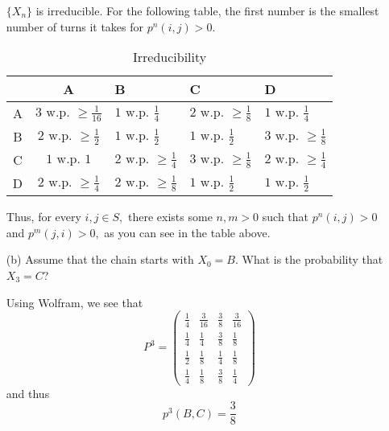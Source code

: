 \documentclass[11pt]{article}
\begin{document}
\begin{problem}
\begin{enumerate}
\begin{solution}
\begin{center}
\end{center}
$\{X_n\}$ is irreducible. For the following table, the first number is the smallest number of turns it takes for $p^n(i,j) >0.$ 
\begin{table}[H]
    \centering
    \begin{tabular}{|c|c|l|l|l|} \hline 
         &   A&B & C&D\\ \hline 
         A& 
     $3 \text{ w.p. } \geq\frac{1}{16}$ & $1 \text{ w.p. }\frac{1}{4}$& $2 \text{ w.p. }\geq\frac{1}{8}$ &$1 \text{ w.p. }\frac{1}{4}$\\ \hline 
 B&$2 \text{ w.p. }\geq\frac{1}{2}$ &$1 \text{ w.p. }\frac{1}{2}$ & $1 \text{ w.p. }\frac{1}{2}$&$3\text{ w.p. }\geq\frac{1}{8}$\\ \hline 
 C&$1 \text{ w.p. }{1}$ &$2 \text{ w.p. }\geq\frac{1}{4}$ &$3 \text{ w.p. }\geq\frac{1}{8}$ &$2 \text{ w.p. }\geq\frac{1}{4}$\\ \hline 
 D&$2 \text{ w.p. }\geq \frac{1}{4}$ &$2 \text{ w.p. }\geq\frac{1}{8}$ &$1 \text{ w.p. }\frac{1}{2}$ &$1 \text{ w.p. }\frac{1}{2}$\\ \hline\end{tabular}
    \caption{Irreducibility} 
\end{table}
Thus, for every $i,j \in S,$ there exists some $n,m>0$ such that $p^n(i,j) >0$ and $p^m(j,i) >0,$ as you can see in the table above. 
    \end{solution}
    \item[(b)] Assume that the chain starts with \( X_0 = B \). What is the probability that \( X_3 = C \)?
\begin{solution}
    Using Wolfram, we see that 
    \[P^3 = 
\begin{pmatrix}
\frac{1}{4} & \frac{3}{16} & \frac{3}{8} & \frac{3}{16} \\
\frac{1}{4} & \frac{1}{4} & \frac{3}{8} & \frac{1}{8} \\
\frac{1}{2} & \frac{1}{8} & \frac{1}{4} & \frac{1}{8} \\
\frac{1}{4} & \frac{1}{8} & \frac{3}{8} & \frac{1}{4}
\end{pmatrix}
\] and thus 
\[\boxed{p^3(B, C) = \frac{3}{8}}\]


\end{solution}
\end{enumerate}
\end{problem}
\end{document}
